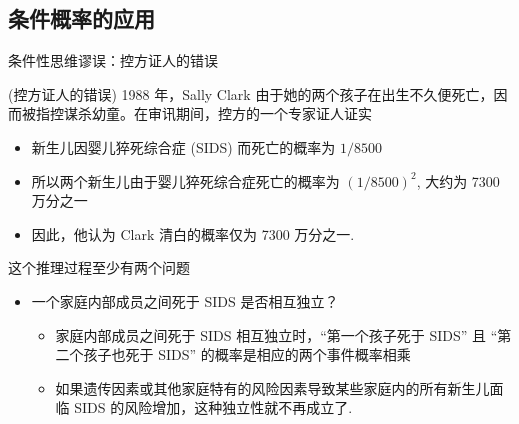 \subsection{条件概率的应用}
\begin{frame}{条件性思维谬误：控方证人的错误}
\begin{exam}{\tc (控方证人的错误)} 1988 年，Sally Clark 由于她的两个孩子在出生不久便死亡，因而被指控谋杀幼童。在审讯期间，控方的一个专家证人证实
\begin{itemize}[<+-|alert@+>]
\item 新生儿因婴儿猝死综合症 (SIDS) 而死亡的概率为 $1/8500$
\item 所以两个新生儿由于婴儿猝死综合症死亡的概率为 $(1/8500)^2$, 大约为 7300 万分之一
\item 因此，他认为 Clark 清白的概率仅为 7300 万分之一.
\end{itemize}
\end{exam}
\vspace{0.2cm}

\pause
\begin{jieda} 这个推理过程至少有两个问题
\begin{itemize}[<+-|alert@+>]
\item 一个家庭内部成员之间死于 SIDS 是否相互独立？
\begin{itemize}[<+-|alert@+>]
\item 家庭内部成员之间死于 SIDS 相互独立时，“第一个孩子死于 SIDS” 且 “第二个孩子也死于 SIDS” 的概率是相应的两个事件概率相乘
\item 如果遗传因素或其他家庭特有的风险因素导致某些家庭内的所有新生儿面临 SIDS 的风险增加，这种独立性就不再成立了.
\end{itemize}
\end{itemize}
\end{jieda}
\end{frame}

